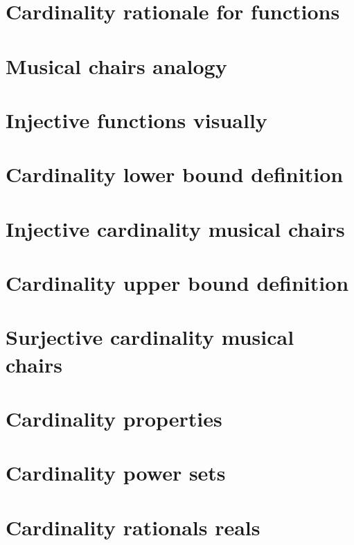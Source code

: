 
\section*{Cardinality rationale for functions}

\vfill
\section*{Musical chairs analogy}

\vfill
\section*{Injective functions visually}

\vfill
\section*{Cardinality lower bound definition}

\vfill
\section*{Injective cardinality musical chairs}

\vfill
\section*{Cardinality upper bound definition}

\vfill
\section*{Surjective cardinality musical chairs}

\vfill
\section*{Cardinality properties}

\vfill
\section*{Cardinality power sets}

\vfill
\section*{Cardinality rationals reals}

\vfill
